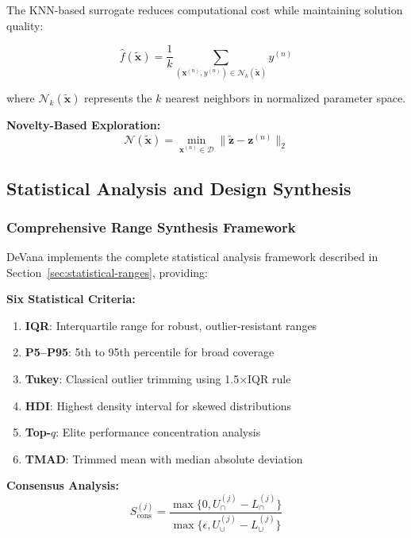 \documentclass[12pt,a4paper]{article}
\newcommand{\softwareName}{DeVana}
\begin{document}
The KNN-based surrogate reduces computational cost while maintaining solution quality:

\begin{equation}
\hat{f}(\tilde{\mathbf{x}}) = \frac{1}{k} \sum_{(\mathbf{x}^{(n)}, y^{(n)}) \in \mathcal{N}_k(\tilde{\mathbf{x}})} y^{(n)}
\end{equation}

where $\mathcal{N}_k(\tilde{\mathbf{x}})$ represents the $k$ nearest neighbors in normalized parameter space.

\textbf{Novelty-Based Exploration:}
\begin{equation}
\mathcal{N}(\tilde{\mathbf{x}}) = \min_{\mathbf{x}^{(n)} \in \mathcal{D}} \|\tilde{\mathbf{z}} - \mathbf{z}^{(n)}\|_2
\end{equation}

\subsection{Statistical Analysis and Design Synthesis}

\subsubsection{Comprehensive Range Synthesis Framework}

\softwareName{} implements the complete statistical analysis framework described in Section~\ref{sec:statistical-ranges}, providing:

\textbf{Six Statistical Criteria:}
\begin{enumerate}
    \item \textbf{IQR}: Interquartile range for robust, outlier-resistant ranges
    \item \textbf{P5--P95}: 5th to 95th percentile for broad coverage
    \item \textbf{Tukey}: Classical outlier trimming using 1.5×IQR rule
    \item \textbf{HDI}: Highest density interval for skewed distributions
    \item \textbf{Top-$q$}: Elite performance concentration analysis
    \item \textbf{TMAD}: Trimmed mean with median absolute deviation
\end{enumerate}

\textbf{Consensus Analysis:}
\begin{equation}
S_{\text{cons}}^{(j)} = \frac{\max\{0, U_{\cap}^{(j)} - L_{\cap}^{(j)}\}}{\max\{\epsilon, U_{\cup}^{(j)} - L_{\cup}^{(j)}\}}
\end{equation}
\end{document}
